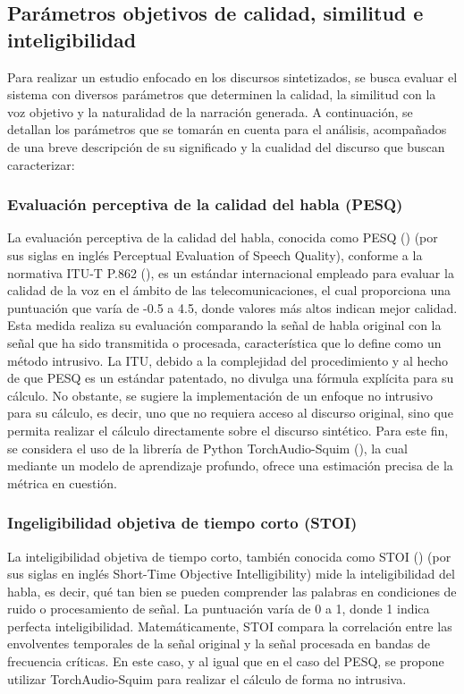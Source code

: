 \subsection{Parámetros objetivos de calidad, similitud e inteligibilidad}

Para realizar un estudio enfocado en los discursos sintetizados, se busca evaluar el sistema con diversos parámetros que determinen la calidad, la similitud con la voz objetivo y la naturalidad de la narración generada. A continuación, se detallan los parámetros que se tomarán en cuenta para el análisis, acompañados de una breve descripción de su significado y la cualidad del discurso que buscan caracterizar:

\subsubsection{Evaluación perceptiva de la calidad del habla (PESQ)}

La evaluación perceptiva de la calidad del habla, conocida como PESQ (\cite{rix2001}) (por sus siglas en inglés Perceptual Evaluation of Speech Quality), conforme a la normativa ITU-T P.862 (\cite{itu-p862}), es un estándar internacional empleado para evaluar la calidad de la voz en el ámbito de las telecomunicaciones, el cual proporciona una puntuación que varía de -0.5 a 4.5, donde valores más altos indican mejor calidad. Esta medida realiza su evaluación comparando la señal de habla original con la señal que ha sido transmitida o procesada, característica que lo define como un método intrusivo. La ITU, debido a la complejidad del procedimiento y al hecho de que PESQ es un estándar patentado, no divulga una fórmula explícita para su cálculo. No obstante, se sugiere la implementación de un enfoque no intrusivo para su cálculo, es decir, uno que no requiera acceso al discurso original, sino que permita realizar el cálculo directamente sobre el discurso sintético. Para este fin, se considera el uso de la librería de Python TorchAudio-Squim (\cite{kumar2023}), la cual mediante un modelo de aprendizaje profundo, ofrece una estimación precisa de la métrica en cuestión. 

\subsubsection{Ingeligibilidad objetiva de tiempo corto (STOI)}

La inteligibilidad objetiva de tiempo corto, también conocida como STOI (\cite{taal2010}) (por sus siglas en inglés Short-Time Objective Intelligibility) mide la inteligibilidad del habla, es decir, qué tan bien se pueden comprender las palabras en condiciones de ruido o procesamiento de señal. La puntuación varía de 0 a 1, donde 1 indica perfecta inteligibilidad. Matemáticamente, STOI compara la correlación entre las envolventes temporales de la señal original y la señal procesada en bandas de frecuencia críticas. En este caso, y al igual que en el caso del PESQ, se propone utilizar TorchAudio-Squim para realizar el cálculo de forma no intrusiva.

